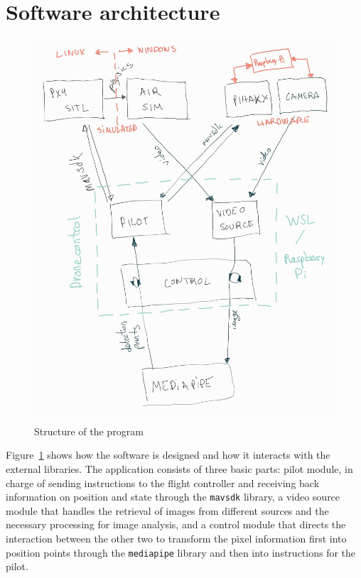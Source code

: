 \section{Software architecture}

\begin{figure}
  \centering
  \includegraphics[width=12cm, keepaspectratio]{img/code_diagram.jpg}
  \caption{Structure of the program}\label{fig:architecture}
\end{figure}

Figure~\ref{fig:architecture} shows how the software is designed and how it interacts with the external libraries.
The application consists of three basic parts: 
pilot module, in charge of sending instructions to the flight controller and receiving back information on position and state through the \verb|mavsdk| library, 
a video source module that handles the retrieval of images from different sources and the necessary processing for image analysis, 
and a control module that directs the interaction between the other two to transform the pixel information first into position points through the \verb|mediapipe| library and then into instructions for the pilot.


